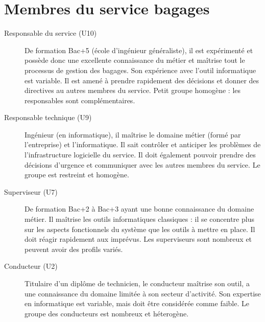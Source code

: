 \section{Membres du service bagages}
\begin{description}
\item[Responsable du service (U10)] De formation Bac+5 (école d'ingénieur
généraliste), il est expérimenté et possède donc une excellente connaissance du
métier et maîtrise tout le processus de gestion des bagages. Son expérience avec
l'outil informatique est variable. Il est amené à prendre rapidement des
décisions et donner des directives au autres membres du service. Petit groupe
homogène : les responsables sont complémentaires.
\item[Responsable technique (U9)] Ingénieur (en informatique), il maîtrise le
domaine métier (formé par l'entreprise) et l'informatique. Il sait contrôler et
anticiper les problèmes de l'infrastructure logicielle du service. Il doit
également pouvoir prendre des décisions d'urgence et communiquer avec les autres
membres du service. Le groupe est restreint et homogène.
\item[Superviseur (U7)] De formation Bac+2 à Bac+3 ayant une bonne connaissance
du domaine métier. Il maîtrise les outils informatiques classiques : il se concentre plus
sur les aspects fonctionnels du système que les outils à mettre en place. Il
doit réagir rapidement aux imprévus. Les superviseurs sont nombreux et peuvent
avoir des profils variés.
\item[Conducteur (U2)] Titulaire d'un diplôme de technicien, le conducteur
maîtrise son outil, a une connaissance du domaine limitée à son secteur d'activité. Son
expertise en informatique est variable, mais doit être considérée comme faible.
Le groupe des conducteurs est nombreux et héterogène.
\end{description}

